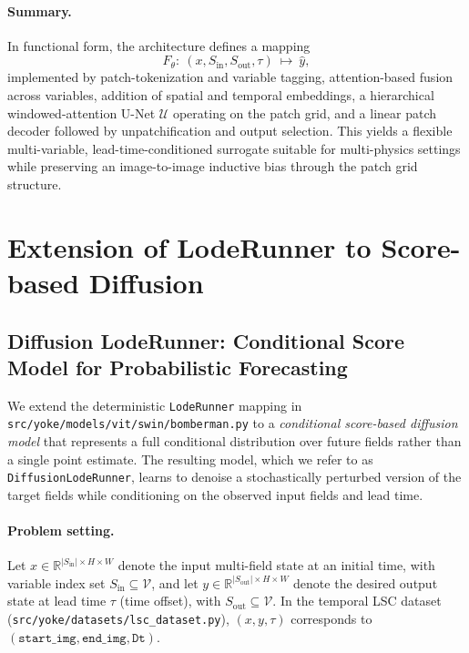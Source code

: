 \documentclass{article} %
\begin{document}
\paragraph{Summary.}
In functional form, the architecture defines a mapping
\[
F_\theta:\ (x, S_{\mathrm{in}}, S_{\mathrm{out}}, \tau)\ \mapsto\ \hat{y},
\]
implemented by patch-tokenization and variable tagging, attention-based fusion across variables, addition of spatial and temporal embeddings, a hierarchical windowed-attention U-Net $\mathcal{U}$ operating on the patch grid, and a linear patch decoder followed by unpatchification and output selection. This yields a flexible multi-variable, lead-time-conditioned surrogate suitable for multi-physics settings while preserving an image-to-image inductive bias through the patch grid structure.


\section{Extension of LodeRunner to Score-based Diffusion}


\subsection{Diffusion LodeRunner: Conditional Score Model for Probabilistic Forecasting}
\label{subsec:loderunner_diffusion_math}

We extend the deterministic \texttt{LodeRunner} mapping in \texttt{src/yoke/models/vit/swin/bomberman.py}
to a \emph{conditional score-based diffusion model} that represents a full conditional distribution
over future fields rather than a single point estimate. The resulting model, which we refer to as
\texttt{DiffusionLodeRunner}, learns to denoise a stochastically perturbed version of the target fields
while conditioning on the observed input fields and lead time.

\paragraph{Problem setting.}
Let $x\in\mathbb{R}^{|S_{\mathrm{in}}|\times H\times W}$ denote the input multi-field state at an initial time,
with variable index set $S_{\mathrm{in}}\subseteq\mathcal{V}$, and let $y\in\mathbb{R}^{|S_{\mathrm{out}}|\times H\times W}$
denote the desired output state at lead time $\tau$ (time offset), with $S_{\mathrm{out}}\subseteq\mathcal{V}$.
In the temporal LSC dataset (\texttt{src/yoke/datasets/lsc\_dataset.py}), $(x,y,\tau)$ corresponds to
$(\texttt{start\_img},\texttt{end\_img},\texttt{Dt})$.
\end{document}
